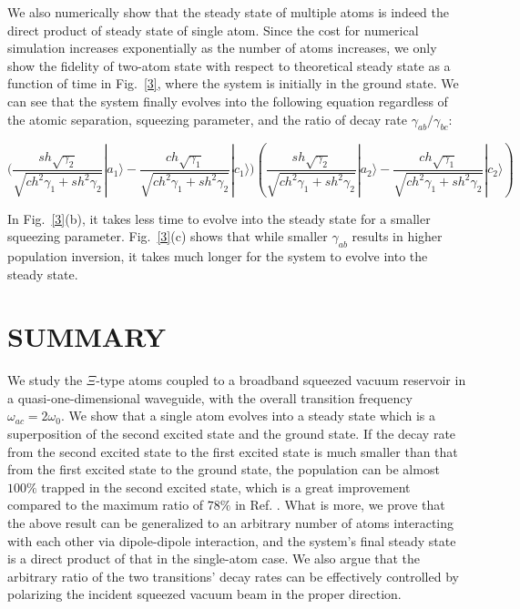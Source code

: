 \documentclass[aps,showpacs,twocolumn,twoside,groupedaddress]{revtex4}
\begin{document}
We also numerically show that the steady state of multiple atoms is indeed the direct product of steady state of single atom. Since the cost for numerical simulation increases exponentially as the number of atoms increases, we only show the fidelity of two-atom state with respect to theoretical steady state as a function of time in Fig.~\ref{3}, where the system is initially in the ground state. We can see that the system finally evolves into the following equation regardless of the atomic separation, squeezing parameter, and the ratio of decay rate $\gamma_{ab}/\gamma_{bc}$: 
\begin{widetext}
\begin{equation}
\ensuremath{(\frac{sh\sqrt{\gamma_{2}}}{\sqrt{ch^{2}\gamma_{1}+sh^{2}\gamma_{2}}}|a_{1}\rangle-\frac{ch\sqrt{\gamma_{1}}}{\sqrt{ch^{2}\gamma_{1}+sh^{2}\gamma_{2}}}|c_{1}\rangle})(\frac{sh\sqrt{\gamma_{2}}}{\sqrt{ch^{2}\gamma_{1}+sh^{2}\gamma_{2}}}|a_{2}\rangle-\frac{ch\sqrt{\gamma_{1}}}{\sqrt{ch^{2}\gamma_{1}+sh^{2}\gamma_{2}}}|c_{2}\rangle)\nonumber
\end{equation}
\end{widetext}
In Fig.~\ref{3}(b), it takes less time to evolve into the steady state for a smaller squeezing parameter. Fig.~\ref{3}(c) shows that while smaller $\gamma_{ab}$ results in higher population inversion, it takes much longer for the system to evolve into the steady state.

\section{SUMMARY}
We study the $\Xi$-type atoms coupled to a broadband squeezed vacuum reservoir in a quasi-one-dimensional waveguide, with the overall transition frequency $\omega_{ac}=2\omega_0$. We show that a single atom evolves into a steady state which is a superposition of the second excited state and the ground state. If the decay rate from the second excited state to the first excited state is much smaller than that from the first excited state to the ground state, the population can be almost $100\%$ trapped in the second excited state, which is a great improvement compared to the maximum ratio of $78\%$ in Ref. \cite{ficek1993two}. What is more, we prove that the above result can be generalized to an arbitrary number of atoms interacting with each other via dipole-dipole interaction, and the system's final steady state is a direct product of that in the single-atom case. We also argue that the arbitrary ratio  of the two transitions' decay rates can be effectively controlled by polarizing the incident squeezed vacuum beam in the proper direction. 
\end{document}
